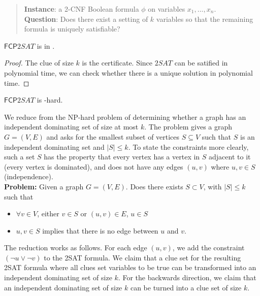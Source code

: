 \documentclass[runningheads,a4paper]{llncs}
\begin{document}
\begin{quote}
\textbf{Instance}: a 2-CNF Boolean formula $\phi$ on variables $x_1, ..., x_n$. \\
\textbf{Question}: Does there exist a setting of $k$ variables so that the remaining formula is uniquely satisfiable?
\end{quote}

\begin{proposition}
$\mathsf{FCP} 2SAT$ is in \NP.
\end{proposition}

\begin{proof}
The clue of size $k$ is the certificate. Since $2SAT$ can be satified in polynomial time, we can check whether there is a unique solution in polynomial time.
\end{proof}

\begin{theorem} 
$\mathsf{FCP} 2SAT$ is \NP-hard.
\end{theorem}

We reduce from the NP-hard problem of determining whether a graph has an independent dominating set of size at most $k$. The problem gives a graph $G = (V,E)$ and asks for the smallest subset of vertices $S \subseteq V$ such that $S$ is an independent dominating set and $|S| \leq k$. To state the constraints more clearly, such a set $S$ has the property that every vertex has a vertex in $S$ adjacent to it (every vertex is dominated), and does not have any edges $(u,v)$ where $u,v \in S$ (independence). \\

\noindent\textbf{Problem:} Given a graph $G = (V, E)$. Does there exists $S \subset V$, with $|S| \leq k$ such that 
\begin{itemize}
\item $\forall v \in V$, either $v \in S$ or $(u, v) \in E$, $u \in S$ 
\item $u, v \in S$ implies that there is no edge between $u$ and $v$. 
\end{itemize}

The reduction works as follows. For each edge $(u,v)$, we add the constraint $(\neg u \vee \neg v)$ to the 2SAT formula. We claim that a clue set for the resulting 2SAT formula where all clues set variables to be true can be transformed into an independent dominating set of size $k$. For the backwards direction, we claim that an independent dominating set of size $k$ can be turned into a clue set of size $k$. 
\end{document}
